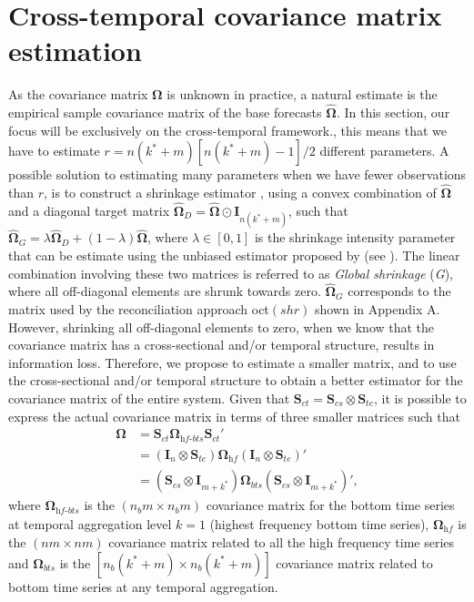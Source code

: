 \documentclass[a4paper,11pt]{article}
\newcommand{\Ivet}{\bm{I}}
\newcommand{\Svet}{\bm{S}}
\newcommand{\Omegavet}{\bm{\Omega}}
\theoremstyle{definition}
\begin{document}
\section{Cross-temporal covariance matrix estimation}\label{sec:shrtech}

As the covariance matrix $\Omegavet$ is unknown in practice, a natural estimate is the empirical sample covariance matrix of the base forecasts $\widehat{\Omegavet}$. In this section, our focus will be exclusively on the cross-temporal framework., this means that we have to estimate $r = n(k^\ast+m)[n(k^\ast+m)-1]/2$ different parameters. A possible solution to estimating many parameters when we have fewer observations than $r$, is to construct a shrinkage estimator \citep{efron1975a,efron1975,efron1977}, using a convex combination of $\widehat{\Omegavet}$ and a diagonal target matrix $\widehat{\Omegavet}_D = \widehat{\Omegavet} \odot \Ivet_{n(k^\ast+m)}$, such that $\widehat{\Omegavet}_{G} = \lambda \widehat{\Omegavet}_D + (1-\lambda) \widehat{\Omegavet}$, where $\lambda \in [0,1]$ is the shrinkage intensity parameter that can be estimate using the unbiased estimator proposed by \cite{ledoit2004a} (see \citealp{schafer2005}). The linear combination involving these two matrices is referred to as \textit{Global shrinkage} (\textit{G}), where all off-diagonal elements are shrunk towards zero. $\widehat{\Omegavet}_{G}$ corresponds to the matrix used by the reconciliation approach oct$(shr)$ shown in Appendix A. However, shrinking all off-diagonal elements to zero, when we know that the covariance matrix has a cross-sectional and/or temporal structure, results in information loss. Therefore, we propose to estimate a smaller matrix, and to use the cross-sectional and/or temporal structure to obtain a better estimator for the covariance matrix of the entire system. Given that $\Svet_{ct} = \Svet_{cs} \otimes \Svet_{te}$, it is possible to express the actual covariance matrix in terms of three smaller matrices such that
\begin{equation}\label{eq:OmSct}
\begin{aligned}
	\Omegavet &= \Svet_{ct}\Omegavet_{\textit{hf-bts}}\Svet_{ct}' \\
	&= \left(\Ivet_n \otimes \Svet_{te}\right)\Omegavet_{\textit{hf}}\left(\Ivet_n \otimes \Svet_{te}\right)' \\
	&= \left(\Svet_{cs} \otimes \Ivet_{m+k^\ast}\right)\Omegavet_{bts}\left(\Svet_{cs} \otimes \Ivet_{m+k^\ast}\right)',
\end{aligned}
\end{equation}
where $\Omegavet_{\textit{hf-bts}}$ is the $(n_b m\times n_b m)$ covariance matrix for the bottom time series at temporal aggregation level $k = 1$ (highest frequency bottom time series), $\Omegavet_{\textit{hf}}$ is the $(nm\times nm)$ covariance matrix related to all the high frequency time series and $\Omegavet_{bts}$ is the $[n_b(k^\ast + m)\times n_b(k^\ast + m)]$ covariance matrix related to bottom time series at any temporal aggregation.
\end{document}
